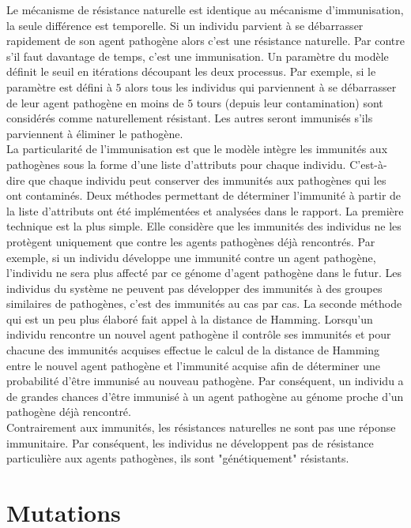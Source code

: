 Le mécanisme de résistance naturelle est identique au mécanisme d'immunisation, la seule différence est temporelle. Si un individu parvient à se débarrasser rapidement de son agent pathogène alors c'est une résistance naturelle. Par contre s'il faut davantage de temps, c'est une immunisation. Un paramètre du modèle définit le seuil en itérations découpant les deux processus. Par exemple, si le paramètre est défini à $5$ alors tous les individus qui parviennent à se débarrasser de leur agent pathogène en moins de $5$ tours (depuis leur contamination) sont considérés comme naturellement résistant. Les autres seront immunisés s'ils parviennent à éliminer le pathogène.\\

La particularité de l'immunisation est que le modèle intègre les immunités aux pathogènes sous la forme d'une liste d'attributs pour chaque individu. C'est-à-dire que chaque individu peut conserver des immunités aux pathogènes qui les ont contaminés. Deux méthodes permettant de déterminer l'immunité à partir de la liste d'attributs ont été implémentées et analysées dans le rapport. La première technique est la plus simple. Elle considère que les immunités des individus ne les protègent uniquement que contre les agents pathogènes déjà rencontrés. Par exemple, si un individu développe une immunité contre un agent pathogène, l'individu ne sera plus affecté par ce génome d'agent pathogène dans le futur. Les individus du système ne peuvent pas développer des immunités à des groupes similaires de pathogènes, c'est des immunités au cas par cas. La seconde méthode qui est un peu plus élaboré fait appel à la distance de Hamming. Lorsqu'un individu rencontre un nouvel agent pathogène il contrôle ses immunités et pour chacune des immunités acquises effectue le calcul de la distance de Hamming entre le nouvel agent pathogène et l'immunité acquise afin de déterminer une probabilité d'être immunisé au nouveau pathogène. Par conséquent, un individu a de grandes chances d'être immunisé à un agent pathogène au génome proche d'un pathogène déjà rencontré.\\

Contrairement aux immunités, les résistances naturelles ne sont pas une réponse immunitaire. Par conséquent, les individus ne développent pas de résistance particulière aux agents pathogènes, ils sont "génétiquement" résistants. 

\section{Mutations}


